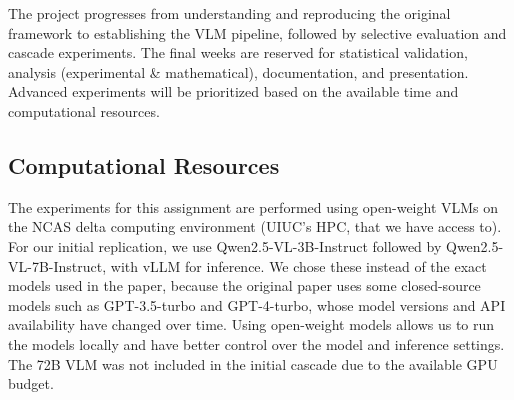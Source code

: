 \documentclass[11pt,a4paper]{article}
\begin{document}
The project progresses from understanding and reproducing the original
framework to establishing the VLM pipeline, followed by selective
evaluation and cascade experiments. The final weeks are reserved for
statistical validation, analysis (experimental \& mathematical), documentation, and presentation.
Advanced experiments will be prioritized based on the available time and
computational resources.

\subsection{Computational Resources}

The experiments for this assignment are performed using open-weight VLMs on the NCAS delta computing environment (UIUC's HPC, that we have access to). For our initial replication, we use Qwen2.5-VL-3B-Instruct followed by Qwen2.5-VL-7B-Instruct, with vLLM for inference. We chose these instead of the exact models used in the paper, because the original paper uses some closed-source models such as GPT-3.5-turbo and GPT-4-turbo, whose model versions and API availability have changed over time. Using open-weight models allows us to run the models locally and have better control over the model and inference settings. The 72B VLM was not included in the initial cascade due to the available GPU budget.




\end{document}
